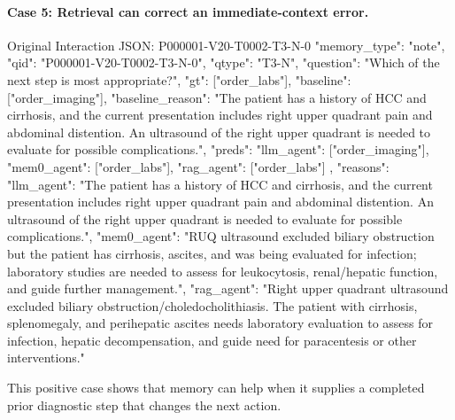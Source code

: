 \paragraph{Case 5: Retrieval can correct an immediate-context error.}
\begin{promptblock}{Original Interaction JSON: P000001-V20-T0002-T3-N-0}
{
  "memory_type": "note",
  "qid": "P000001-V20-T0002-T3-N-0",
  "qtype": "T3-N",
  "question": "Which of the next step is most appropriate?",
  "gt": ["order_labs"],
  "baseline": ["order_imaging"],
  "baseline_reason": "The patient has a history of HCC and cirrhosis, and the current presentation includes right upper quadrant pain and abdominal distention. An ultrasound of the right upper quadrant is needed to evaluate for possible complications.",
  "preds": {
    "llm_agent": ["order_imaging"],
    "mem0_agent": ["order_labs"],
    "rag_agent": ["order_labs"]
  },
  "reasons": {
    "llm_agent": "The patient has a history of HCC and cirrhosis, and the current presentation includes right upper quadrant pain and abdominal distention. An ultrasound of the right upper quadrant is needed to evaluate for possible complications.",
    "mem0_agent": "RUQ ultrasound excluded biliary obstruction but the patient has cirrhosis, ascites, and was being evaluated for infection; laboratory studies are needed to assess for leukocytosis, renal/hepatic function, and guide further management.",
    "rag_agent": "Right upper quadrant ultrasound excluded biliary obstruction/choledocholithiasis. The patient with cirrhosis, splenomegaly, and perihepatic ascites needs laboratory evaluation to assess for infection, hepatic decompensation, and guide need for paracentesis or other interventions."
  }
}
\end{promptblock}

This positive case shows that memory can help when it supplies a completed prior diagnostic step that changes the next action.

